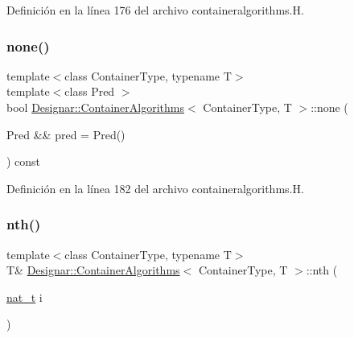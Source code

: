 Definición en la línea 176 del archivo containeralgorithms.\+H.

\mbox{\label{class_designar_1_1_container_algorithms_a10a88dd8adee474d79cc412db2f5739c}} 
\subsubsection{\texorpdfstring{none()}{none()}\hspace{0.1cm}{\footnotesize\ttfamily [2/2]}}
{\footnotesize\ttfamily template$<$class Container\+Type, typename T$>$ \\
template$<$class Pred $>$ \\
bool \hyperlink{class_designar_1_1_container_algorithms}{Designar\+::\+Container\+Algorithms}$<$ Container\+Type, T $>$\+::none (\begin{DoxyParamCaption}\item[{Pred \&\&}]{pred = {\ttfamily Pred()} }\end{DoxyParamCaption}) const\hspace{0.3cm}{\ttfamily [inline]}}



Definición en la línea 182 del archivo containeralgorithms.\+H.

\mbox{\label{class_designar_1_1_container_algorithms_a519e813f4b2e787dfb7d743910ad3e4b}} 
\subsubsection{\texorpdfstring{nth()}{nth()}\hspace{0.1cm}{\footnotesize\ttfamily [1/2]}}
{\footnotesize\ttfamily template$<$class Container\+Type, typename T$>$ \\
T\& \hyperlink{class_designar_1_1_container_algorithms}{Designar\+::\+Container\+Algorithms}$<$ Container\+Type, T $>$\+::nth (\begin{DoxyParamCaption}\item[{\hyperlink{namespace_designar_aa72662848b9f4815e7bf31a7cf3e33d1}{nat\+\_\+t}}]{i }\end{DoxyParamCaption})\hspace{0.3cm}{\ttfamily [inline]}}



